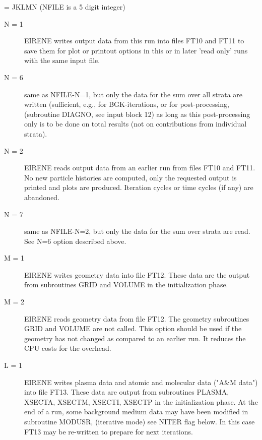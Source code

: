 \begin{description}
        = JKLMN   (NFILE is a 5 digit integer)
        \begin{description}
          \item [N = 1 ] EIRENE writes output data from this run into files FT10 and FT11
                to save them for plot or printout options in this or in later 'read only' runs
                with the same input file.
          \item [N = 6 ] same as NFILE-N=1, but only the data for the sum over all strata
                are written (sufficient, e.g., for \acs{BGK}-iterations, or for
                post-processing, (subroutine DIAGNO, see input block 12) as long as this
                post-processing only is to be done on total results (not on contributions from
                individual strata).
          \item [N = 2 ] EIRENE reads output data from an earlier run from files FT10 and
                FT11.
                No new particle histories are computed, only the requested output is printed
                and plots are produced.
                Iteration cycles or time cycles (if any) are abandoned.
          \item [N = 7 ] same as NFILE-N=2, but only the data for the sum over strata are
                read.
                See N=6 option described above.
          \item [M = 1 ] EIRENE writes geometry data into file FT12.
                These data are the output from subroutines GRID and VOLUME in the
                initialization phase.
          \item [M = 2 ] EIRENE reads geometry data from file FT12.
                The geometry subroutines GRID and VOLUME are not called.
                This option should be used if the geometry has not changed as compared to an
                earlier run.
                It reduces the CPU costs for the overhead.
          \item [L = 1 ] EIRENE writes plasma data and atomic and molecular data ("A\&M
                data") into file FT13.
                These data are output from subroutines PLASMA, XSECTA, XSECTM, XSECTI, XSECTP
                in the initialization phase.
                At the end of a run, some background medium data may have been modified in
                subroutine MODUSR, (iterative mode) see NITER flag below.
                In this case FT13 may be re-written to prepare for next iterations.


\end{description}
\end{description}
